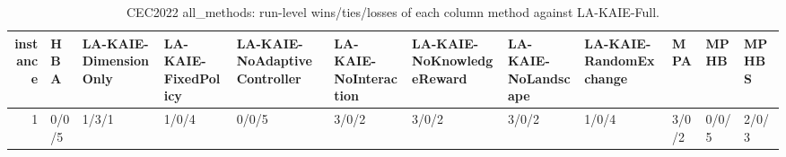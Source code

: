 \begin{table}[t]
\centering
\scriptsize
\caption{CEC2022 all_methods: run-level wins/ties/losses of each column method against LA-KAIE-Full.}
\label{tab:cec2022_all_methods_wtl}
\begin{tabular}{rlllllllllll}
\toprule
instance & HBA & LA-KAIE-DimensionOnly & LA-KAIE-FixedPolicy & LA-KAIE-NoAdaptiveController & LA-KAIE-NoInteraction & LA-KAIE-NoKnowledgeReward & LA-KAIE-NoLandscape & LA-KAIE-RandomExchange & MPA & MPHB & MPHBS \\
\midrule
1 & 0/0/5 & 1/3/1 & 1/0/4 & 0/0/5 & 3/0/2 & 3/0/2 & 3/0/2 & 1/0/4 & 3/0/2 & 0/0/5 & 2/0/3 \\
\bottomrule
\end{tabular}
\end{table}
